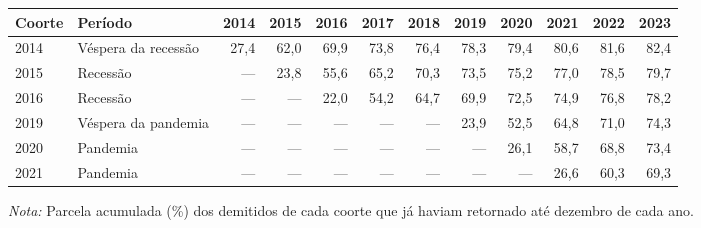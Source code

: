 \providecommand{\toprule}{\hline\hline}
\providecommand{\midrule}{\hline}
\providecommand{\bottomrule}{\hline\hline}
\providecommand{\addlinespace}[1][]{}
{\small
\renewcommand{\arraystretch}{1.12}
\begin{tabular}{llrrrrrrrrrr}
\toprule
Coorte & Período & 2014 & 2015 & 2016 & 2017 & 2018 & 2019 & 2020 & 2021 & 2022 & 2023 \\
\midrule
2014 & Véspera da recessão & 27,4 & 62,0 & 69,9 & 73,8 & 76,4 & 78,3 & 79,4 & 80,6 & 81,6 & 82,4 \\
2015 & Recessão & --- & 23,8 & 55,6 & 65,2 & 70,3 & 73,5 & 75,2 & 77,0 & 78,5 & 79,7 \\
2016 & Recessão & --- & --- & 22,0 & 54,2 & 64,7 & 69,9 & 72,5 & 74,9 & 76,8 & 78,2 \\
2019 & Véspera da pandemia & --- & --- & --- & --- & --- & 23,9 & 52,5 & 64,8 & 71,0 & 74,3 \\
2020 & Pandemia & --- & --- & --- & --- & --- & --- & 26,1 & 58,7 & 68,8 & 73,4 \\
2021 & Pandemia & --- & --- & --- & --- & --- & --- & --- & 26,6 & 60,3 & 69,3 \\
\bottomrule
\end{tabular}
\vspace{2pt}
\par{\footnotesize \textit{Nota:} Parcela acumulada (\%) dos demitidos de cada coorte que já haviam retornado até dezembro de cada ano.}
}
